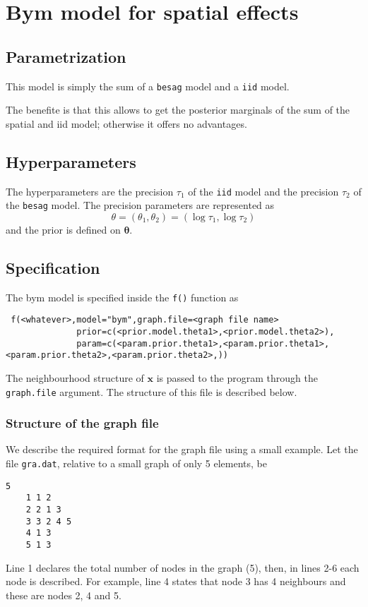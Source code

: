 \documentclass[a4paper,11pt]{article}
\begin{document}
\section*{Bym model for spatial effects}

\subsection*{Parametrization}

This model is simply the sum of a \lstinline$besag$ model and a
\lstinline$iid$ model.
 
The benefite is that this allows to get the posterior marginals of the
sum of the spatial and iid model; otherwise it offers no advantages.

\subsection*{Hyperparameters}
The hyperparameters are the precision $\tau_1$ of the \lstinline$iid$
model and the precision $\tau_2$ of the \lstinline$besag$ model.  The
precision parameters are represented as
\begin{displaymath}
    \theta=(\theta_1,\theta_2) =(\log \tau_1,\log \tau_2)
\end{displaymath}
and the prior is defined on $\mathbf{\theta}$.

\subsection*{Specification}

The bym model is specified inside the {\tt f()} function as
\begin{verbatim}
 f(<whatever>,model="bym",graph.file=<graph file name>
              prior=c(<prior.model.theta1>,<prior.model.theta2>),
              param=c(<param.prior.theta1>,<param.prior.theta1>,<param.prior.theta2>,<param.prior.theta2>,))
\end{verbatim}

The neighbourhood structure of $\mathbf{x}$ is passed to the program
through the {\tt graph.file} argument.  The structure of this file is
described below.

\subsubsection*{Structure of the graph file}

We describe the required format for the graph file using a small
example. Let the file {\tt gra.dat}, relative to a small graph of only
5 elements, be
\begin{lstlisting}[basicstyle=\footnotesize]
    5
    1 1 2
    2 2 1 3
    3 3 2 4 5 
    4 1 3
    5 1 3
\end{lstlisting}
Line 1 declares the total number of nodes in the graph (5), then, in
lines 2-6 each node is described. For example, line 4 states that node
3 has 4 neighbours and these are nodes 2, 4 and 5.
\end{document}
